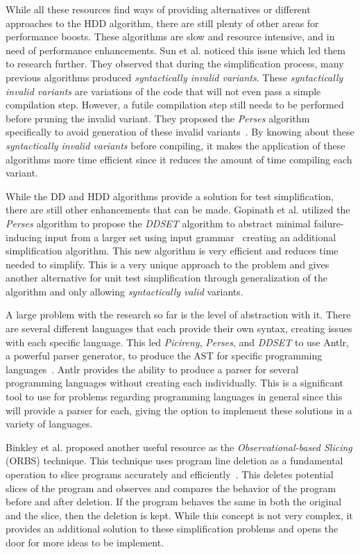 While all these resources find ways of providing alternatives or different approaches to the HDD algorithm, there are still plenty of other areas for performance boosts. These algorithms are slow and resource intensive, and in need of performance enhancements. Sun et al. noticed this issue which led them to research further. They observed that during the simplification process, many previous algorithms produced \emph{syntactically invalid variants}. These \emph{syntactically invalid variants} are variations of the code that will not even pass a simple compilation step. However, a futile compilation step still needs to be performed before pruning the invalid variant. They proposed the \emph{Perses} algorithm specifically to avoid generation of these invalid variants~\cite{perses}. By knowing about these \emph{syntactically invalid variants} before compiling, it makes the application of these algorithms more time efficient since it reduces the amount of time compiling each variant.

While the DD and HDD algorithms provide a solution for test simplification, there are still other enhancements that can be made. Gopinath et al. utilized the \emph{Perses} algorithm to propose the \emph{DDSET} algorithm to abstract minimal failure-inducing input from a larger set using input grammar~\cite{gopinath2020abstracting} creating an additional simplification algorithm. This new algorithm is very efficient and reduces time needed to simplify. This is a very unique approach to the problem and gives another alternative for unit test simplification through generalization of the algorithm and only allowing \emph{syntactically valid} variants.

A large problem with the research so far is the level of abstraction with it. There are several different languages that each provide their own syntax, creating issues with each specific language. This led \emph{Picireny}, \emph{Perses}, and \emph{DDSET} to use Antlr, a powerful parser generator, to produce the AST for specific programming languages~\cite{parr}. Antlr provides the ability to produce a parser for several programming languages without creating each individually. This is a significant tool to use for problems regarding programming languages in general since this will provide a parser for each, giving the option to implement these solutions in a variety of languages.

Binkley et al. proposed another useful resource as the \emph{Observational-based Slicing} (ORBS) technique. This technique uses program line deletion as a fundamental operation to slice programs accurately and efficiently~\cite{binkley2014orbs}. This deletes potential slices of the program and observes and compares the behavior of the program before and after deletion. If the program behaves the same in both the original and the slice, then the deletion is kept. While this concept is not very complex, it provides an additional solution to these simplification problems and opens the door for more ideas to be implement.

